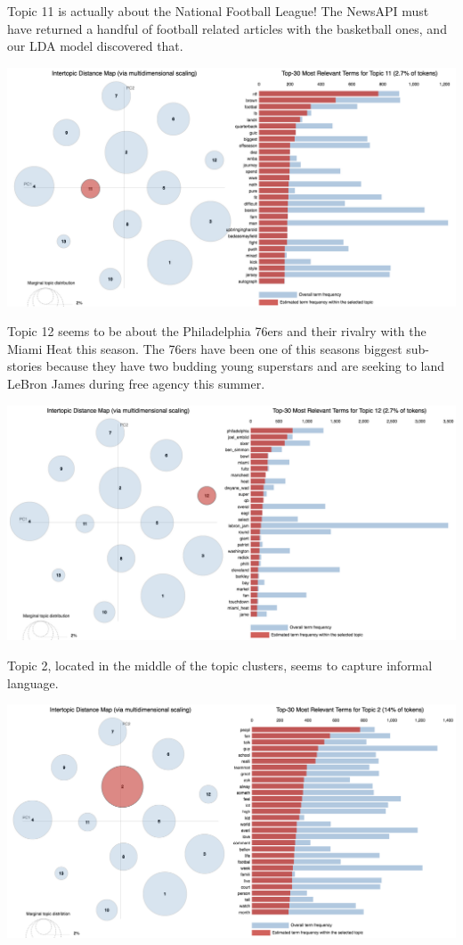 \documentclass[11pt]{article}
\begin{document}
Topic 11 is actually about the National Football League!  The NewsAPI must have returned a handful of football related articles with the basketball ones, and our LDA model discovered that. 

\includegraphics[width=470pt]{11.png} 

Topic 12 seems to be about the Philadelphia 76ers and their rivalry with the Miami Heat this season. The 76ers have been one of this seasons biggest sub-stories because they have two budding young superstars and are seeking to land LeBron James during free agency this summer.

\includegraphics[width=470pt]{12.png} 

Topic 2, located in the middle of the topic clusters, seems to capture informal language. 

\includegraphics[width=470pt]{2.png} 
\end{document}
